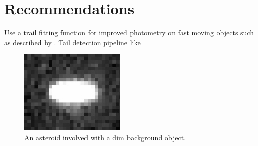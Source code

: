 \documentclass[iop,apj]{emulateapj}
\begin{document}
\section{Recommendations }

Use a trail fitting function for improved photometry on fast moving objects such as described by \cite{veres12}.
Tail detection pipeline like \cite{sonnett11}








\begin{figure}[!htb]
    \centering
    \includegraphics[height=4cm]{images/background_gal.jpeg}
    \caption{An asteroid involved with a dim background object. }\label{fig:3}
\end{figure}
\end{document}
